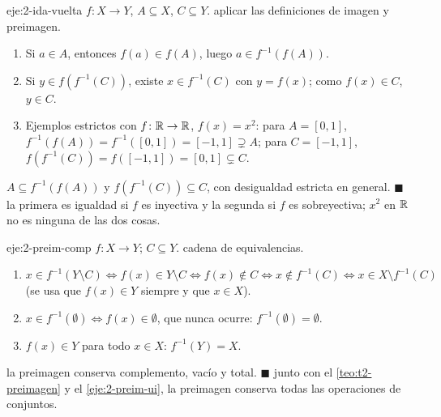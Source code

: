 \begin{solucion}{eje:2-ida-vuelta}
\datos $f\colon X\to Y$, $A\subseteq X$, $C\subseteq Y$.
\planteamiento aplicar las definiciones de imagen y preimagen.
\pasos
\begin{enumerate}[label=\arabic*.]
  \item Si $a\in A$, entonces $f(a)\in f(A)$, luego $a\in f^{-1}(f(A))$.
  \item Si $y\in f(f^{-1}(C))$, existe $x\in f^{-1}(C)$ con $y=f(x)$; como $f(x)\in C$, $y\in C$.
  \item Ejemplos estrictos con $f\colon\mathbb{R}\to\mathbb{R}$, $f(x)=x^{2}$: para $A=[0,1]$, $f^{-1}(f(A))=f^{-1}([0,1])=[-1,1]\supsetneq A$; para $C=[-1,1]$, $f(f^{-1}(C))=f([-1,1])=[0,1]\subsetneq C$.
\end{enumerate}
\resultado $A\subseteq f^{-1}(f(A))$ y $f(f^{-1}(C))\subseteq C$, con desigualdad estricta en general. \hfill$\blacksquare$
\comprobacion la primera es igualdad si $f$ es inyectiva y la segunda si $f$ es sobreyectiva; $x^{2}$ en $\mathbb{R}$ no es ninguna de las dos cosas.
\end{solucion}

\begin{solucion}{eje:2-preim-comp}
\datos $f\colon X\to Y$; $C\subseteq Y$.
\planteamiento cadena de equivalencias.
\pasos
\begin{enumerate}[label=\arabic*.]
  \item $x\in f^{-1}(Y\setminus C)\iff f(x)\in Y\setminus C\iff f(x)\notin C\iff x\notin f^{-1}(C)\iff x\in X\setminus f^{-1}(C)$ (se usa que $f(x)\in Y$ siempre y que $x\in X$).
  \item $x\in f^{-1}(\emptyset)\iff f(x)\in\emptyset$, que nunca ocurre: $f^{-1}(\emptyset)=\emptyset$.
  \item $f(x)\in Y$ para todo $x\in X$: $f^{-1}(Y)=X$.
\end{enumerate}
\resultado la preimagen conserva complemento, vacío y total. \hfill$\blacksquare$
\comprobacion junto con el \cref{teo:t2-preimagen} y el \cref{eje:2-preim-ui}, la preimagen conserva todas las operaciones de conjuntos.
\end{solucion}


